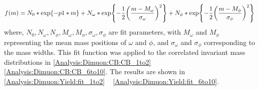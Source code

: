                \begin{eqnarray}
                    f(m)=N_0*\exp{-p1* m}+N_{\omega}*\exp{-\frac{1}{2}\qty(\frac{m-M_{\omega}}{\sigma_{\omega}})^2}+N_{\phi}*\exp{-\frac{1}{2}\qty(\frac{m-M_{\phi}}{\sigma_{\phi}})^2}
                \end{eqnarray}
                where, $N_0, N_{\omega}, N_{\phi}, M_{\omega}, M_{\phi}, \sigma_{\omega}, \sigma_{\phi}$ are fit parameters, with $M_{\omega}$ and $M_{\phi}$ representing the mean mass positions of $\omega$ and $\phi$, and $\sigma_{\omega}$ and $\sigma_{\phi}$ corresponding to the mass widths. This fit function was applied to the correlated invariant mass distributions in \ref{Analysis:Dimuon:CB:CB_1to2} ~ \ref{Analysis:Dimuon:CB:CB_6to10}. The results are shown in \ref{Analysis:Dimuon:Yield:fit_1to2} ~ \ref{Analysis:Dimuon:Yield:fit_6to10}.\@
